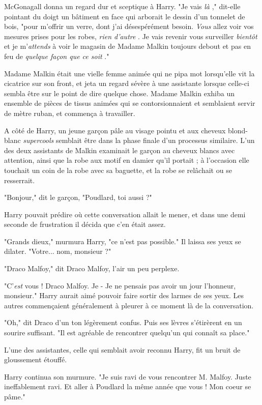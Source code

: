 McGonagall donna un regard dur et sceptique à Harry. "Je vais \emph{là} ," dit-elle pointant du doigt un bâtiment en face qui arborait le dessin d'un tonnelet de bois, "pour m'offrir un verre, dont j'ai désespérément besoin. \emph{Vous}  allez voir vos mesures prises pour les robes, \emph{rien d'autre} . Je vais revenir vous surveiller \emph{bientôt } et je m'\emph{attends}  à voir le magasin de Madame Malkin toujours debout et pas en feu de \emph{quelque façon que ce soit} ."

Madame Malkin était une vielle femme animée qui ne pipa mot lorsqu'elle vit la cicatrice sur son front, et jeta un regard sévère à une assistante lorsque celle-ci sembla être sur le point de dire quelque chose. Madame Malkin exhiba un ensemble de pièces de tissus animées qui se contorsionnaient et semblaient servir de mètre ruban, et commença à travailler.

A côté de Harry, un jeune garçon pâle au visage pointu et aux cheveux blond-blanc \emph{supercools } semblait être dans la phase finale d'un processus similaire. L'un des deux assistants de Malkin examinait le garçon au cheveux blancs avec attention, ainsi que la robe aux motif en damier qu'il portait ; à l'occasion elle touchait un coin de la robe avec sa baguette, et la robe se relâchait ou se resserrait.

"Bonjour," dit le garçon, "Poudlard, toi aussi ?"

Harry pouvait prédire où cette conversation allait le mener, et dans une demi seconde de frustration il décida que c'en était assez.

"Grands dieux," murmura Harry, "ce n'est pas possible." Il laissa ses yeux se dilater. "Votre... nom, monsieur ?"

"Draco Malfoy," dit Draco Malfoy, l'air un peu perplexe.

"C'\emph{est}  vous ! Draco Malfoy. Je - Je ne pensais pas avoir un jour l'honneur, monsieur." Harry aurait aimé pouvoir faire sortir des larmes de ses yeux. Les autres commençaient généralement à pleurer à ce moment là de la conversation.

"Oh," dit Draco d'un ton légèrement confus. Puis ses lèvres s'étirèrent en un sourire suffisant. "Il est agréable de rencontrer quelqu'un qui connaît sa place."

L'une des assistantes, celle qui semblait avoir reconnu Harry, fit un bruit de gloussement étouffé.

Harry continua son murmure. "Je suis ravi de vous rencontrer M. Malfoy. Juste ineffablement ravi. Et aller à Poudlard la même année que vous ! Mon coeur se pâme."

